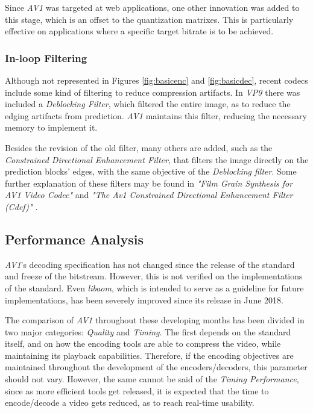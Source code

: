 Since \emph{AV1} was targeted at web applications, one other innovation was added to this stage, which is an offset to the quantization matrixes. This is particularly effective on applications where a specific target bitrate is to be achieved.

\subsubsection{In-loop Filtering}

Although not represented in Figures \ref{fig:basicenc} and \ref{fig:basicdec}, recent codecs include some kind of filtering to reduce compression artifacts. In \emph{VP9} there was included a \emph{Deblocking Filter}, which filtered the entire image, as to reduce the edging artifacts from prediction. \emph{AV1} maintains this filter, reducing the necessary memory to implement it. 

Besides the revision of the old filter, many others are added, such as the \emph{Constrained Directional Enhancement Filter}, that filters the image directly on the prediction blocks' edges, with the same objective of the \emph{Deblocking filter}. Some further explanation of these filters may be found in \emph{"Film Grain Synthesis for AV1 Video Codec"} \cite{norkinFilmGrainSynthesis2018} and \emph{"The Av1 Constrained Directional Enhancement Filter (Cdef)"} \cite{midtskogenAv1ConstrainedDirectional2018}.

%

\subsection{Performance Analysis}

\emph{AV1}'s decoding specification has not changed since the release of the standard and freeze of the bitstream. However, this is not verified on the implementations of the standard. Even \emph{libaom}, which is intended to serve as a guideline for future implementations, has been severely improved since its release in June 2018. 

The comparison of \emph{AV1} throughout these developing months has been divided in two major categories: \emph{Quality} and \emph{Timing}. The first depends on the standard itself, and on how the encoding tools are able to compress the video, while maintaining its playback capabilities. Therefore, if the encoding objectives are maintained throughout the development of the encoders/decoders, this parameter should not vary. However, the same cannot be said of the \emph{Timing Performance}, since as more efficient tools get released, it is expected that the time to encode/decode a video gets reduced, as to reach real-time usability.

